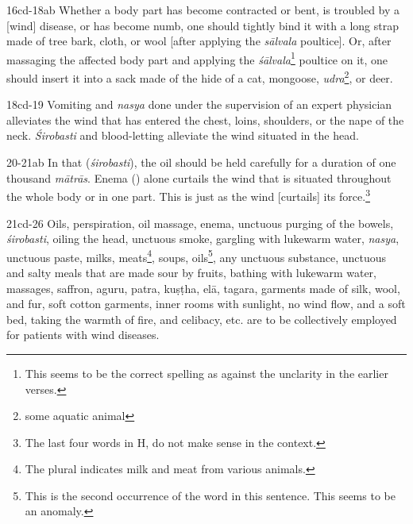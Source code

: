 \begin{translation}
    \item[16cd-18ab]
     Whether a body part has become contracted or bent, is troubled by a [wind] disease, or has become numb, one should tightly bind it with a long strap made of tree bark, cloth, or wool [after applying the \textit{sālvala} poultice]. Or, after massaging the affected body part and applying the \textit{śālvala}\footnote{This seems to be the correct spelling as against the unclarity in the earlier verses.} poultice on it, one should insert it into a sack made of the hide of a cat, mongoose, \textit{udra}\footnote{some aquatic animal}, or deer.

    \item[18cd-19]
    Vomiting and \textit{nasya} done under the supervision of an expert physician alleviates the wind that has entered the chest, loins, shoulders, or the nape of the neck. \textit{Śirobasti} and blood-letting alleviate the wind situated in the head. 

    \item[20-21ab]
    In that (\textit{śirobasti}), the oil should be held carefully for a duration of one thousand \textit{mātrās}. Enema () alone curtails the wind that is situated throughout the whole body or in one part. This is just as the wind [curtails] its force.\footnote{The last four words in H,  do not make sense in the context.} 

    \item[21cd-26]
    Oils, perspiration, oil massage, enema, unctuous purging of the bowels, \textit{śirobasti}, oiling the head, unctuous smoke, gargling with lukewarm water, \textit{nasya}, unctuous paste, milks, meats\footnote{The plural indicates milk and meat from various animals.}, soups, oils\footnote{This is the second occurrence of the word  in this sentence. This seems to be an anomaly.}, any unctuous substance, unctuous and salty meals that are made sour by fruits, bathing with lukewarm water, massages, saffron, \gls{aguru}, \gls{patra}, \gls{kuṣṭha}, \gls{elā}, \gls{tagara}, garments made of silk, wool, and fur, soft cotton garments, inner rooms with sunlight, no wind flow, and a soft bed, taking the warmth of fire, and celibacy, etc. are to be collectively employed for patients with wind diseases.    


\end{translation}
